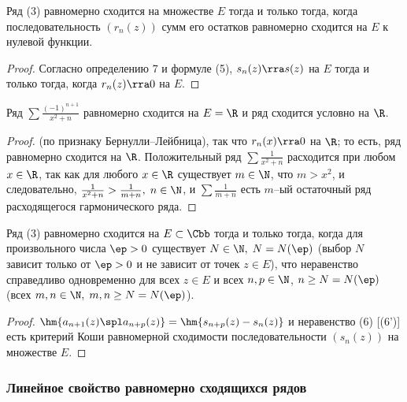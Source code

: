 \documentclass[a4paper]{article}
\newenvironment{stm*}{\par\vskip\theoremskip\textbf{Утверждение.}\normalfont \itshape}{\par\vskip\theoremskip}
\begin{document}
\begin{stm*}
Ряд (3) равномерно сходится на множестве $E$ тогда и только тогда,
когда последовательность $(r_n(z))$ сумм его остатков равномерно
сходится на $E$ к нулевой функции.
\end{stm*}

\begin{proof}
Согласно определению 7 и формуле (5), $s_n(z)\rra s(z)$ на $E$ тогда
и только тогда, когда $r_n(z)\rra0$ на $E$.
\end{proof}

\begin{ex}
Ряд $\sum \frac{(-1)^{n+1}}{x^2+n}$ равномерно сходится на $E=\R$ и
ряд сходится условно на $\R$.
\end{ex}

\begin{proof}
 (по признаку Бернулли--Лейбница), так что
$r_n(x)\rra0$ на $\R$; то есть, ряд равномерно сходится на $\R$.
Положительный ряд $\sum\frac1{x^2+n}$ расходится при любом $x\in\R$,
так как для любого $x\in\R$ существует $m\in\N$, что $m>x^2$, и
следовательно, $\frac1{x^2+n} > \frac1{m+n}, \; n\in\N$, и
$\sum\frac1{m+n}$ есть $m$--ый остаточный ряд расходящегося
гармонического ряда.
\end{proof}

\begin{theorem}
Ряд (3) равномерно сходится на $E\subset\Cbb$ тогда и только тогда,
когда для произвольного числа $\ep>0$ существует $N\in\N, \;
N=N(\ep)$ (выбор $N$ зависит только от $\ep>0$ и не зависит от точек
$z\in E$), что неравенство   справедливо
одновременно для всех $z\in E$ и всех $n,p\in\N$, $n\ge N=N(\ep)$
(всех $m,n\in\N, \; m,n\ge N=N(\ep)$).
\end{theorem}

\begin{proof}
$\hm{a_{n+1}(z)\spl a_{n+p}(z)}=\hm{s_{n+p}(z)-s_n(z)}$ и
неравенство (6) [(6')] есть критерий Коши равномерной сходимости
последовательности $(s_n(z))$ на множестве $E$.
\end{proof}

\subsubsection{Линейное свойство равномерно сходящихся рядов}
\end{document}

